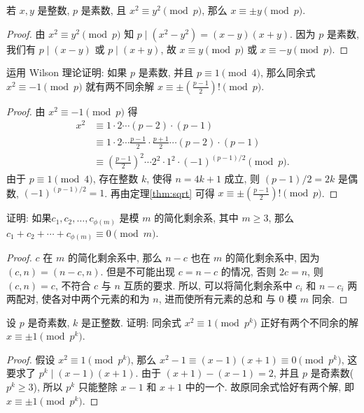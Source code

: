 \documentclass[a5paper,fleqn,10pt]{article}
\begin{document}
\begin{thm}\label{thm:sqrt}
	若 $x,y$ 是整数, $p$ 是素数, 且 $x^2\equiv y^2\pmod p$, 那么 $x\equiv\pm y\pmod p$.
\end{thm}
\begin{proof}
	由 $x^2\equiv y^2\pmod p$ 知 $p\mid(x^2-y^2)=(x-y)(x+y)$. 因为 $p$ 是素数, 我们有 $p\mid(x-y)$ 或 $p\mid(x+y)$,
	故 $x\equiv y\pmod p$ 或 $x\equiv -y\pmod p$.
\end{proof}

\begin{exmp}
	运用 Wilson 理论证明: 如果 $p$ 是素数, 并且 $p\equiv 1\pmod 4$, 那么同余式 $x^2\equiv -1\pmod p$ 就有两不同余解
	$x\equiv\pm\left(\frac{p-1}{2}\right)!\pmod p$.
\end{exmp}
\begin{proof}
	由 $x^2\equiv -1\pmod p$ 得
	\begin{align*}
		x^2 & \equiv 1\cdot 2\cdots(p-2)\cdot(p-1)                                              \\
		    & \equiv 1\cdot 2\cdots\frac{p-1}{2}\cdot\frac{p+1}{2}\cdots(p-2)\cdot(p-1)         \\
		    & \equiv \left(\frac{p-1}{2}\right)^2\cdots 2^2\cdot 1^2\cdot(-1)^{(p-1)/2}\pmod p.
	\end{align*}
	由于 $p\equiv 1\pmod 4$, 存在整数 $k$, 使得 $n=4k+1$ 成立, 则 $(p-1)/2=2k$ 是偶数, $(-1)^{(p-1)/2}=1$.
	再由定理\ref{thm:sqrt} 可得 $x\equiv\pm\left(\frac{p-1}{2}\right)!\pmod p$.
\end{proof}

\begin{exmp}
	证明: 如果$c_1,c_2,\ldots,c_{\phi(m)}$ 是模 $m$ 的简化剩余系, 其中 $m\geq 3$, 那么 $c_1+c_2+\cdots+c_{\phi(m)}\equiv 0\pmod m$.
\end{exmp}
\begin{proof}
	$c$ 在 $m$ 的简化剩余系中, 那么 $n-c$ 也在 $m$ 的简化剩余系中, 因为 $(c,n)=(n-c,n)$.
	但是不可能出现 $c=n-c$ 的情况, 否则 $2c=n$, 则 $(c,n)=c$, 不符合 $c$ 与 $n$ 互质的要求. 所以,
	可以将简化剩余系中 $c_i$ 和 $n-c_i$ 两两配对, 使各对中两个元素的和为 $n$, 进而使所有元素的总和
	与 $0$ 模 $m$ 同余.
\end{proof}

\begin{exmp}
	设 $p$ 是奇素数, $k$ 是正整数. 证明: 同余式 $x^2\equiv 1\pmod{p^k}$ 正好有两个不同余的解 $x\equiv\pm 1\pmod{p^k}$.
\end{exmp}
\begin{proof}
	假设 $x^2\equiv 1\pmod{p^k}$, 那么 $x^2-1\equiv(x-1)(x+1)\equiv 0\pmod{p^k}$, 这要求了 $p^k\mid(x-1)(x+1)$.
	由于 $(x+1)-(x-1)=2$, 并且 $p$ 是奇素数($p^k\geq 3$), 所以 $p^k$ 只能整除 $x-1$ 和 $x+1$ 中的一个.
	故原同余式恰好有两个解, 即 $x\equiv\pm 1\pmod{p^k}$.
\end{proof}
\end{document}
